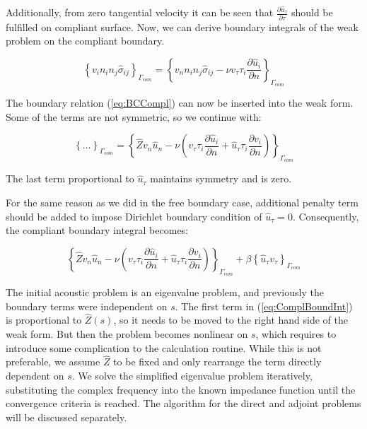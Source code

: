 Additionally, from zero tangential velocity it can be seen that $\frac{\partial \hat{u}_{\tau}}{\partial \tau}$ should be fulfilled on compliant surface. Now, we can derive boundary integrals of the weak problem on the compliant boundary. 

\begin{equation}
\left\{ v_i n_i n_j \hat{\sigma}_{ij} \right\}_{\Gamma_{com}} = \left\{ v_n n_i n_j \hat{\sigma}_{ij} - \nu v_{\tau} \tau_i \frac{\partial \hat{u}_i}{\partial n} \right\}_{\Gamma_{com}}
\end{equation}

The boundary relation (\ref{eq:BCCompl}) can now be inserted into the weak form. Some of the terms are not symmetric, so we continue with:

\begin{equation}
\left\{ ... \right\}_{\Gamma_{com}} = \left\{\hat{Z} v_n \hat{u}_n  - \nu \left( v_{\tau} \tau_i \frac{\partial \hat{u}_i}{\partial n} + \hat{u}_{\tau} \tau_i \frac{\partial v_i}{\partial n}  \right) \right\}_{\Gamma_{com}}
\end{equation}

The last term proportional to $\hat{u}_{\tau}$ maintains symmetry and is zero.

For the same reason as we did in the free boundary case, additional penalty term should be added to impose Dirichlet boundary condition of $\hat{u}_{\tau} = 0$. Consequently, the compliant boundary integral becomes:

\begin{equation}
\label{eq:ComplBoundInt}
\left\{\hat{Z} v_n \hat{u}_n - \nu \left( v_{\tau} \tau_i \frac{\partial \hat{u}_i}{\partial n} + \hat{u}_{\tau} \tau_i \frac{\partial v_i}{\partial n} \right) \right\}_{\Gamma_{com}} + \beta \left\{ \hat{u}_{\tau} v_{\tau} \right\}_{\Gamma_{com}}
\end{equation}

The initial acoustic problem is an eigenvalue problem, and previously the boundary terms were independent on $s$. The first term in (\ref{eq:ComplBoundInt}) is proportional to $\hat{Z}(s)$, so it needs to be moved to the right hand side of the weak form. But then the problem becomes nonlinear on $s$, which requires to introduce some complication to the calculation routine. While this is not preferable, we assume $\hat{Z}$ to be fixed and only rearrange the term directly dependent on $s$. We solve the simplified eigenvalue problem iteratively, substituting the complex frequency into the known impedance function until the convergence criteria is reached. The algorithm for the direct and adjoint problems will be discussed separately.

